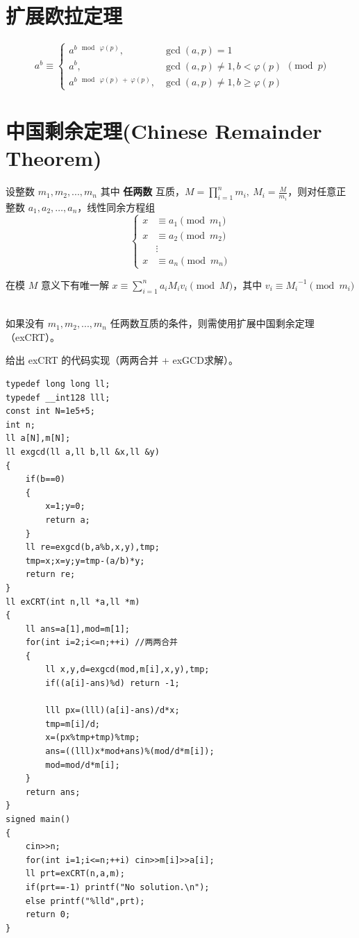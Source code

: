 \section{扩展欧拉定理}
$$
a^b\equiv \begin{cases} a^{b\ \bmod\ \varphi(p)},&\gcd(a,p)=1\\ a^b,&\gcd(a,p)\ne1,b<\varphi(p)\\ a^{b\ \bmod\ \varphi(p)\ +\ \varphi(p)},&\gcd(a,p)\ne1,b\ge\varphi(p) \end{cases} \pmod p
$$

\section{中国剩余定理(Chinese Remainder Theorem)}
\par \noindent 设整数 $m_1,m_2,...,m_n$ 其中 \textbf{任两数} 互质，$M = \prod_{i = 1}^nm_i,\ M_i = \frac{M}{m_i}$，则对任意正整数 $a_1, a_2, \dots, a_n$，线性同余方程组
$$
\begin{cases} 
    x &\equiv a_1 \pmod {m_1} \\ x &\equiv a_2 \pmod {m_2} \\ &\vdots \\ x &\equiv a_n \pmod {m_n} 
\end{cases}
$$
\par \noindent 在模 $M$ 意义下有唯一解 $x \equiv \sum_{i = 1}^{n} a_iM_iv_i \pmod M$，其中 $v_i \equiv {M_i}^{-1} \pmod {m_i}$
~\\
\par \noindent 如果没有 $m_1,m_2,...,m_n$ 任两数互质的条件，则需使用扩展中国剩余定理（exCRT）。
~\\
\par \noindent 给出 exCRT 的代码实现（两两合并 + exGCD求解）。
\begin{verbatim}
typedef long long ll;
typedef __int128 lll;
const int N=1e5+5;
int n;
ll a[N],m[N];
ll exgcd(ll a,ll b,ll &x,ll &y)
{
    if(b==0)
    {
        x=1;y=0;
        return a;
    }
    ll re=exgcd(b,a%b,x,y),tmp;
    tmp=x;x=y;y=tmp-(a/b)*y;
    return re;
}
ll exCRT(int n,ll *a,ll *m)
{
    ll ans=a[1],mod=m[1];
    for(int i=2;i<=n;++i) //两两合并
    {
        ll x,y,d=exgcd(mod,m[i],x,y),tmp;
        if((a[i]-ans)%d) return -1;

        lll px=(lll)(a[i]-ans)/d*x;
        tmp=m[i]/d;
        x=(px%tmp+tmp)%tmp;
        ans=((lll)x*mod+ans)%(mod/d*m[i]);
        mod=mod/d*m[i];
    }
    return ans;
}
signed main()
{
    cin>>n;
    for(int i=1;i<=n;++i) cin>>m[i]>>a[i];
    ll prt=exCRT(n,a,m);
    if(prt==-1) printf("No solution.\n");
    else printf("%lld",prt);
    return 0;
}
\end{verbatim}

